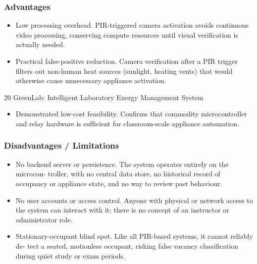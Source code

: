 \subsubsection*{Advantages}



\begin{itemize}
  \item Low processing overhead. PIR-triggered camera activation avoids continuous video
processing, conserving compute resources until visual veriﬁcation is actually needed.
\end{itemize}


\begin{itemize}
  \item Practical false-positive reduction. Camera veriﬁcation after a PIR trigger ﬁlters
out non-human heat sources (sunlight, heating vents) that would otherwise cause
unnecessary appliance activation.
\end{itemize}

20
GreenLab: Intelligent Laboratory Energy Management System


\begin{itemize}
  \item Demonstrated low-cost feasibility. Conﬁrms that commodity microcontroller and
relay hardware is sufﬁcient for classroom-scale appliance automation.
\end{itemize}



\subsubsection*{Disadvantages / Limitations}



\begin{itemize}
  \item No backend server or persistence. The system operates entirely on the microcon-
troller, with no central data store, no historical record of occupancy or appliance state,
and no way to review past behaviour.
\end{itemize}

\begin{itemize}
  \item No user accounts or access control. Anyone with physical or network access to the
system can interact with it; there is no concept of an instructor or administrator role.
\end{itemize}

\begin{itemize}
  \item Stationary-occupant blind spot. Like all PIR-based systems, it cannot reliably de-
tect a seated, motionless occupant, risking false vacancy classiﬁcation during quiet
study or exam periods.
\end{itemize}



